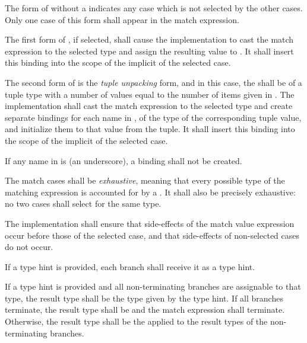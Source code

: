 

\specsubsubitem
The form of  without a  indicates any
case which is not selected by the other cases. Only one case of this form shall
appear in the match expression.

\specsubsubitem
The first form of , if selected, shall cause the
implementation to cast the match expression to the selected type and assign the
resulting value to . It shall insert this binding into the
scope of the implicit  of the selected case.

\specsubsubitem
The second form of  is the \textit{tuple unpacking}
form, and in this case, the  shall be of a tuple type
with a number of values equal to the number of items given in
. The implementation shall cast the match expression
to the selected type and create separate bindings for each name in
, of the type of the corresponding tuple value, and
initialize them to that value from the tuple. It shall insert this binding into
the scope of the implicit  of the selected
case.

\specsubsubitem
If any name in  is \terminal{\_} (an underscore), a
binding shall not be created.

\specsubsubitem
The match cases shall be \textit{exhaustive}, meaning that every possible type
of the matching expression is accounted for by a . It
shall also be precisely exhaustive: no two cases shall select for the same
type.

\specsubsubitem
The implementation shall ensure that side-effects of the match value
expression occur before those of the selected case, and that side-effects of
non-selected cases do not occur.

\specsubsubitem
If a type hint is provided, each branch shall receive it as a type hint.

\specsubsubitem
If a type hint is provided and all non-terminating branches are assignable to
that type, the result type shall be the type given by the type hint. If all
branches terminate, the result type shall be  and the match
expression shall terminate. Otherwise, the result type shall be the
 applied to the result types of the
non-terminating branches.


